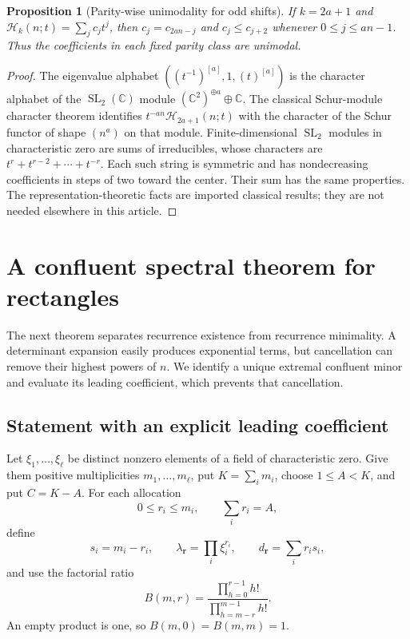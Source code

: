 \documentclass[11pt]{article}
\newtheorem{proposition}[theorem]{Proposition}
\theoremstyle{definition}
\theoremstyle{remark}
\newcommand{\Ht}{\mathcal H}
\newcommand{\C}{\mathbb C}
\newcommand{\SL}{\operatorname{SL}}
\newcommand{\rep}[2]{(#1)^{[#2]}}
\theoremstyle{definition}
\theoremstyle{plain}
\numberwithin{equation}{section}
\begin{document}
\begin{proposition}[Parity-wise unimodality for odd shifts]
\label{rs:prop:parityunimodal}
If $k=2a+1$ and $\Ht_k(n;t)=\sum_j c_jt^j$, then
$c_j=c_{2an-j}$ and $c_j\le c_{j+2}$ whenever $0\le j\le an-1$.
Thus the coefficients in each fixed parity class are unimodal.
\end{proposition}
\begin{proof}
The eigenvalue alphabet $(\rep{t^{-1}}a,1,\rep ta)$ is the character
alphabet of the $\SL_2(\C)$ module $(\C^2)^{\oplus a}\oplus\C$.
The classical Schur-module character theorem \cite{Fulton} identifies
$t^{-an}\Ht_{2a+1}(n;t)$ with the character of the Schur functor of shape
$(n^a)$ on that module. Finite-dimensional $\SL_2$ modules in characteristic
zero are sums of irreducibles, whose characters are
$t^r+t^{r-2}+\cdots+t^{-r}$. Each such string is symmetric and has
nondecreasing coefficients in steps of two toward the center. Their sum has
the same properties. The representation-theoretic facts are imported
classical results; they are not needed elsewhere in this article.
\end{proof}

\section{A confluent spectral theorem for rectangles}
\label{rs:sec:cluster}
The next theorem separates recurrence existence from recurrence minimality.
A determinant expansion easily produces exponential terms, but cancellation
can remove their highest powers of $n$. We identify a unique extremal
confluent minor and evaluate its leading coefficient, which prevents that
cancellation.

\subsection{Statement with an explicit leading coefficient}
Let $\xi_1,\ldots,\xi_\ell$ be distinct nonzero elements of a field of
characteristic zero. Give them positive multiplicities $m_1,\ldots,m_\ell$,
put $K=\sum_i m_i$, choose $1\le A<K$, and put $C=K-A$.
For each allocation
\begin{equation}
 0\le r_i\le m_i,\qquad \sum_i r_i=A,
 \label{rs:eq:allocation}
\end{equation}
define
\begin{equation}
 s_i=m_i-r_i,\qquad
 \lambda_{\boldsymbol r}=\prod_i\xi_i^{r_i},\qquad
 d_{\boldsymbol r}=\sum_i r_i s_i,
 \label{rs:eq:lambdad}
\end{equation}
and use the factorial ratio
\begin{equation}
 B(m,r)=\frac{\prod_{h=0}^{r-1}h!}
              {\prod_{h=m-r}^{m-1}h!}.
 \label{rs:eq:Bfactor}
\end{equation}
An empty product is one, so $B(m,0)=B(m,m)=1$.
\end{document}
